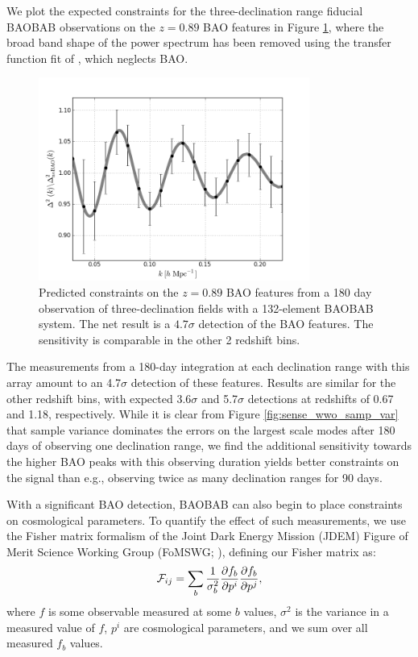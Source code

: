 \documentclass[10pt,iop]{emulateapj}
\begin{document}
We plot the expected constraints for the three-declination range fiducial BAOBAB observations on
the $z = 0.89$ BAO features in Figure \ref{fig:baobab128_sense}, where the broad band
shape of the power spectrum has been removed using the transfer function fit
of \citet{eisenstein_and_hu_1998}, which neglects BAO.  
\begin{figure}\centering
\includegraphics[width=3.5in]{baobab128_sense-2.png}
\caption{Predicted constraints on the $z = 0.89$ BAO features from a 180 day observation
of three-declination fields with
a 132-element BAOBAB system.  The net result is a $4.7\sigma$ detection of the BAO features.  The sensitivity is comparable in the other 2 redshift bins.
} \label{fig:baobab128_sense}
\end{figure}
The measurements from a 180-day integration at each declination range with this array 
amount to an 4.7$\sigma$ detection of these features.  Results are similar
for the other redshift bins, with expected 3.6$\sigma$ and 5.7$\sigma$ detections at redshifts of 
0.67 and 1.18, respectively.  While it is clear from Figure \ref{fig:sense_wwo_samp_var} that
sample variance dominates the errors on the largest scale modes after 180 days of observing
one declination range, we find the additional sensitivity towards the higher BAO peaks with this
observing duration yields better constraints on the signal than e.g., observing twice as many
declination ranges for 90 days.  

With a significant BAO detection, BAOBAB can also begin to place 
constraints on cosmological parameters.  To quantify the effect of such measurements,
we use the Fisher matrix formalism of the Joint Dark Energy Mission (JDEM) Figure of Merit
Science Working Group (FoMSWG; \citealt{albrecht_et_al_2009}), defining our Fisher matrix as:
\begin{equation}
\label{eq:fish}
{\cal F}_{ij} = \sum_b \frac{1}{\sigma_b^2}\frac{\partial f_b}{\partial p^i}\frac{\partial f_b}{\partial p^j},
\end{equation}
where $f$ is some observable measured at some $b$ values, $\sigma^2$ is the variance in a 
measured value of $f$, $p^i$ are cosmological parameters, and
we sum over all measured $f_b$ values.  
\end{document}
